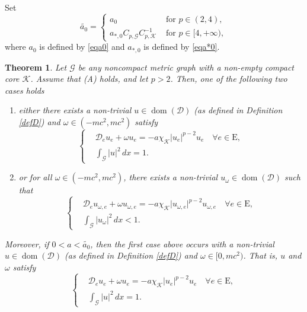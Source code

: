 \documentclass[11pt]{amsart}
\newtheorem{theorem}{Theorem}[section]
\newcommand{\abs}[1]{\lvert#1\rvert}
\newcommand{\D}{\mathcal{D}}
\newcommand{\G}{\mathcal{G}}
\newcommand{\K}{\mathcal{K}}
\numberwithin{equation}{section}
\begin{document}
Set $$
    \widetilde{a_0}= \begin{cases}a_0 & \text { for } p\in(2,4),\\ a_{*,0}C_{p,\G}C_{p,\K}^{-1} & \text { for } p \in [4,+\infty),  \end{cases}
$$
where $a_0$ is defined by \eqref{eqa0} and $a_{*,0}$ is defined by \eqref{eqa*0}.
\begin{theorem}\label{th-a3}
     Let $\G$ be any noncompact metric graph with a non-empty compact core $\K$. Assume that {\rm(A)} holds, and let $p>2$. Then, one of the following two cases holds\\
    \begin{enumerate}[label=\rm(\roman*)]
        \item either there exists a non-trivial $u \in \operatorname{dom}(\D)$ (as defined in Definition \ref{defD}) and $\omega \in (-mc^2, mc^2)$ satisfy
    \begin{equation*}
    \left\{\begin{aligned}
        &\D_e u_e + \omega u_e=-a\chi_\K\abs{u_e}^{p-2}u_e \quad \forall e\in \mathrm{E},\\
        &\int_\G\abs{u}^2\,dx = 1.
    \end{aligned}
    \right.
\end{equation*}
\item  or for all $\omega \in (-mc^2, mc^2)$, there exists a non-trivial $u_\omega \in \operatorname{dom}(\D)$ such that
    \begin{equation*}
    \left\{\begin{aligned}
        &\D_e u_{\omega,e} + \omega u_{\omega,e} = -a\chi_\K\abs{u_{\omega,e}}^{p-2}u_{\omega,e} \quad\forall e\in \mathrm{E},\\
        &\int_\G\abs{u_\omega}^2\,dx < 1.
    \end{aligned}
    \right.
    \end{equation*}
\end{enumerate}
Moreover, if $0<a<\widetilde{a_0}$, then the first case above occurs with a  non-trivial $u \in \operatorname{dom}(\D)$ (as defined in Definition \ref{defD}) and $\omega \in [0, mc^2)$.
That is, $u$ and $\omega$ satisfy
    \begin{equation*}
    \left\{\begin{aligned}
        &\D_e u_e + \omega u_e= -a\chi_\K\abs{u_e}^{p-2}u_e \quad \forall e\in \mathrm{E},\\
        &\int_\G\abs{u}^2\,dx = 1.
    \end{aligned}
    \right.
\end{equation*}
\end{theorem}
\end{document}
